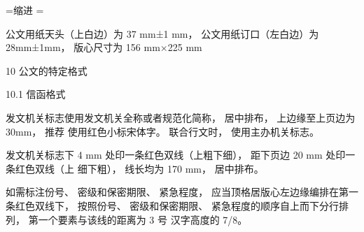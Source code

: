\documentclass{article}
\begin{document}
\fontsize{15.85}{15.85}
=\hbox{缩进}
\parindent=
\baselineskip=10.446428571428571mm

\hoffset=-56pt
\voffset=1pt


\the\textwidth

\the\vsize
\the\hsize



\pagestyle{fancy}





\fancyhead[L,R]{}
\fancyfoot[L]{}
\fancyfoot[C]{}
\fancyfoot[R]{\thepage}
\renewcommand{\headrulewidth}{0.4pt}
\renewcommand{\footrulewidth}{2pt}



\setlength\headwidth{170mm}

\newdimen\doublelineskip %
\setlength\doublelineskip{2pt}
\renewcommand\headrule{%

  {\color{red}%
  \vskip 4mm%
  \hrule height\headrulewidth width\headwidth%
  \vskip \doublelineskip%
  \hrule height 1pt width\headwidth}%
  }
  
\renewcommand\footrule{{%
  \color{red}%
  \vskip 4mm%
  \hrule height 1pt width \headwidth%
  \vskip \doublelineskip%
  \hrule height \headrulewidth width\headwidth%
  }}


\renewcommand{\headrulewidth}{1mm}
\renewcommand{\footrulewidth}{1mm}



公文用纸天头（上白边）为 37 mm±1 mm，
公文用纸订口（左白边）为 28mm±1mm，
版心尺寸为 156 mm×225 mm


10 公文的特定格式

10.1 信函格式

发文机关标志使用发文机关全称或者规范化简称， 居中排布， 上边缘至上页边为 30mm， 推荐
使用红色小标宋体字。 联合行文时， 使用主办机关标志。

发文机关标志下 4 mm 处印一条红色双线（上粗下细）， 距下页边 20 mm 处印一条红色双线（上
细下粗）， 线长均为 170 mm， 居中排布。

如需标注份号、 密级和保密期限、 紧急程度， 应当顶格居版心左边缘编排在第一条红色双线下，
按照份号、 密级和保密期限、 紧急程度的顺序自上而下分行排列， 第一个要素与该线的距离为 3 号
汉字高度的 7/8。
\end{document}

